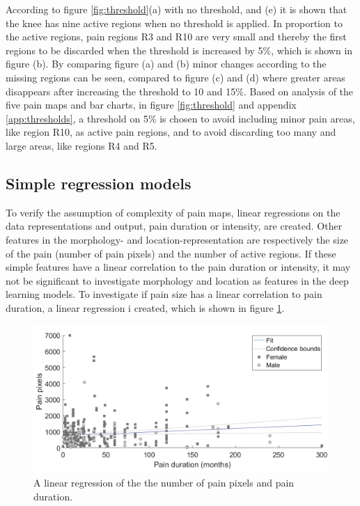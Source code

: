 \noindent
According to figure \ref{fig:threshold}(a) with no threshold, and (e) it is shown that the knee has nine active regions when no threshold is applied. In proportion to the active regions, pain regions R3 and R10 are very small and thereby the first regions to be discarded when the threshold is increased by 5\%, which is shown in figure (b).
By comparing figure (a) and (b) minor changes according to the missing regions can be seen, compared to figure (c) and (d) where greater areas disappears after increasing the threshold to 10 and 15\%.
\noindent
Based on analysis of the five pain maps and bar charts, in figure \ref{fig:threshold} and appendix \ref{app:thresholds}, a threshold on 5\% is chosen to avoid including minor pain areas, like region R10, as active pain regions, and to avoid discarding too many and large areas, like regions R4 and R5.


\subsection{Simple regression models}
To verify the assumption of complexity of pain maps, linear regressions on the data representations and output, pain duration or intensity, are created. 
Other features in the morphology- and location-representation are respectively the size of the pain (number of pain pixels) and the number of active regions. If these simple features have a linear correlation to the pain duration or intensity,  it may not be significant to investigate morphology and location as features in the deep learning models. \newline
\noindent
To investigate if pain size has a linear correlation to pain duration, a linear regression i created, which is shown in figure \ref{fig:durapixel}.
\newline

\begin{figure} [H]
\centering
\includegraphics[width=1\textwidth]{figures/durapixel}
\caption{A linear regression of the the number of pain pixels and pain duration.}
\label{fig:durapixel}
\end{figure}

